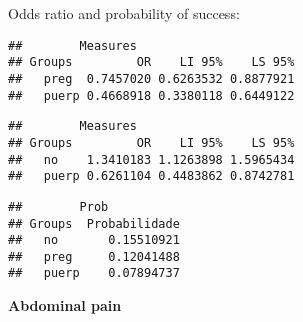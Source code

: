 \documentclass[
]{article}
\newenvironment{Shaded}{\begin{snugshade}}{\end{snugshade}}
\newcommand{\CommentTok}[1]{\textcolor[rgb]{0.56,0.35,0.01}{\textit{#1}}}
\newcommand{\KeywordTok}[1]{\textcolor[rgb]{0.13,0.29,0.53}{\textbf{#1}}}
\newcommand{\NormalTok}[1]{#1}
\newcommand{\OperatorTok}[1]{\textcolor[rgb]{0.81,0.36,0.00}{\textbf{#1}}}
\begin{document}
Odds ratio and probability of success:

\begin{Shaded}
\end{Shaded}

\begin{verbatim}
##        Measures
## Groups         OR    LI 95%    LS 95%
##   preg  0.7457020 0.6263532 0.8877921
##   puerp 0.4668918 0.3380118 0.6449122
\end{verbatim}

\begin{Shaded}
\end{Shaded}

\begin{verbatim}
##        Measures
## Groups         OR    LI 95%    LS 95%
##   no    1.3410183 1.1263898 1.5965434
##   puerp 0.6261104 0.4483862 0.8742781
\end{verbatim}

\begin{Shaded}
\end{Shaded}

\begin{verbatim}
##        Prob
## Groups  Probabilidade
##   no       0.15510921
##   preg     0.12041488
##   puerp    0.07894737
\end{verbatim}

\textbf{Abdominal pain}
\end{document}
